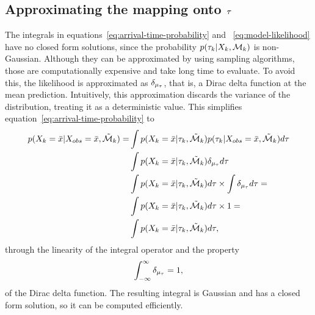 \subsection{Approximating the mapping onto $\tau$}
The integrals in
equations~\ref{eq:arrival-time-probability} and
~\ref{eq:model-likelihood} have no closed form solutions, since the probability
$p(\tau_{k} \vert X_{k}, \mathcal{M}_{k})$ is
non-Gaussian. Although they can be approximated by using sampling algorithms,
those are computationally expensive and take long time to evaluate. To
avoid this, the likelihood is approximated as
$\delta_{\mu_{\tau}}$, that is, a Dirac delta function at the
mean prediction. Intuitively, this approximation discards the variance
of the distribution, treating it as a deterministic value. 
This simplifies equation~\ref{eq:arrival-time-probability} to 
\begin{equation}
  \begin{split}
    p(X_{k} = \bar{x} \vert X_{obs} = \bar{x},
    \tilde{\mathcal{M}}_{k}) = &
    \int p(X_{k} = \bar{x} \vert \tau_{k}, \tilde{\mathcal{M}}_{k}) 
    p(\tau_{k} \vert X_{obs} = \bar{x},
    \tilde{\mathcal{M}}_{k}) d\tau \\
    & \int p(X_{k} = \bar{x} \vert \tau_{k}, \tilde{\mathcal{M}}_{k}) 
    \delta_{\mu_{\tau}} d\tau \\
    &\int p(X_{k} = \bar{x} \vert \tau_{k}, \tilde{\mathcal{M}}_{k}) d\tau
    \times \int \delta_{\mu_{\tau}} d\tau = \\
    &\int p(X_{k} = \bar{x} \vert \tau_{k},
    \tilde{\mathcal{M}}_{k}) d\tau \times 1 = \\
    &\int p(X_{k} = \bar{x} \vert \tau_{k},
    \tilde{\mathcal{M}}_{k}) d\tau,
  \end{split}
\end{equation}
through the linearity of the integral operator and the property
\begin{equation}
  \label{eq:dirac-integral}
  \int_{-\infty}^{\infty} \delta_{\mu_{\tau}} = 1,
\end{equation}
of the Dirac delta function. The resulting integral is Gaussian
and has a closed form solution, so it can be computed efficiently.

